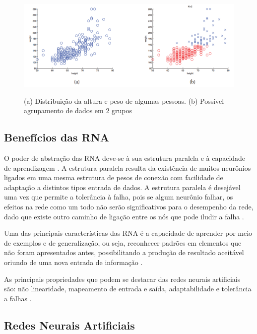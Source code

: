 \begin{figure}[h]
    \caption{(a) Distribuição da altura e peso de algumas pessoas. (b) Possível agrupamento de dados em 2 grupos}
    \centering
    \includegraphics[width=1.0\textwidth]{Textuais/Figuras/nao-supervisionado.png}
    \label{fig:nao-supervisionado}
\end{figure}

\subsection{Benefícios das RNA}

O poder de abstração das RNA deve-se à sua estrutura paralela e à capacidade de aprendizagem \cite{big-data}. A estrutura paralela resulta da existência de muitos neurônios ligados em uma mesma estrutura de pesos de conexão com facilidade de adaptação a distintos tipos entrada de dados. A estrutura paralela é desejável uma vez que permite a tolerância à falha, pois se algum neurônio falhar, os efeitos na rede como um todo não serão significativos para o desempenho da rede, dado que existe outro caminho de ligação entre os nós que pode iludir a falha \cite{statistical-learning}.

Uma das principais características das RNA é a capacidade de aprender por meio de exemplos e de generalização, ou seja, reconhecer padrões em elementos que não foram apresentados antes, possibilitando a produção de resultado aceitável oriundo de uma nova entrada de informação \cite{neural-network}.

As principais propriedades que podem se destacar das redes neurais artificiais são: não linearidade, mapeamento de entrada e saída, adaptabilidade e tolerância a falhas \cite{neural-network}.

\subsection{Redes Neurais Artificiais}

